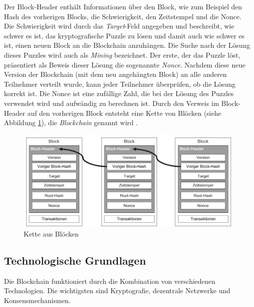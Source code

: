 \noindent Der Block-Header enthält Informationen über den Block, wie zum Beispiel den Hash des vorherigen Blocks, die Schwierigkeit, den Zeitstempel und die Nonce. Die Schwierigkeit wird durch das \textit{Target}-Feld angegeben und beschreibt, wie schwer es ist, das kryptografische Puzzle zu lösen und damit auch wie schwer es ist, einen neuen Block an die Blockchain anzuhängen. Die Suche nach der Lösung dieses Puzzles wird auch als \textit{Mining} bezeichnet. Der erste, der das Puzzle löst, präsentiert als Beweis dieser Lösung die sogenannte \textit{Nonce}. Nachdem diese neue Version der Blockchain (mit dem neu angehängten Block) an alle anderen Teilnehmer verteilt wurde, kann jeder Teilnehmer überprüfen, ob die Lösung korrekt ist. Die Nonce ist eine zufällige Zahl, die bei der Lösung des Puzzles verwendet wird und aufwändig zu berechnen ist. Durch den Verweis im Block-Header auf den vorherigen Block entsteht eine Kette von Blöcken (siehe Abbildung \ref{fig:chain_of_blocks}), die \textit{Blockchain} genannt wird \parencite[S. 10-12]{Fill_BlockchainGrundlagen}.

\begin{figure}[H]
    \centering
    \includegraphics[width=0.9\linewidth]{images/chain_of_blocks.png}
    \caption{Kette aus Blöcken \parencite[S. 12]{Fill_BlockchainGrundlagen}}
    \label{fig:chain_of_blocks}
\end{figure}


\subsection{Technologische Grundlagen}
\label{subsec:blockchain_technological_basics}

Die Blockchain funktioniert durch die Kombination von verschiedenen Technologien. Die wichtigsten sind Kryptografie, dezentrale Netzwerke und Konsensmechanismen. 

